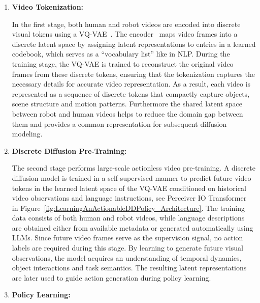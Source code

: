 \begin{enumerate}
    \item \textbf{Video Tokenization:}
    
    In the first stage, both human and robot videos are encoded into discrete visual tokens using a \acf{VQ-VAE}~\cite{Oord2017NeuralDR}. The encoder~\cite{Yan2021VideoGPTVG} maps video frames into a discrete latent space by assigning latent representations to entries in a learned codebook, which serves as a ``vocabulary list'' like in \acs{NLP}. 
    During the training stage, the \ac{VQ-VAE} is trained to reconstruct the original video frames from these discrete tokens, ensuring that the tokenization captures the necessary details for accurate video representation.
    As a result, each video is represented as a sequence of discrete tokens that compactly capture objects, scene structure and motion patterns. 
    Furthermore the shared latent space between robot and human videos helps to reduce the domain gap between them and provides a common representation for subsequent diffusion modeling.
    
    \item \textbf{Discrete Diffusion Pre-Training:} 
    
    The second stage performs large-scale actionless video pre-training. A discrete diffusion model is trained in a self-supervised manner to predict future video tokens in the learned latent space of the \ac{VQ-VAE} conditioned on historical video observations and language instructions, see Perceiver IO Transformer~\cite{Jaegle2021PerceiverIA} in Figure~\ref{fig:LearningAnActionableDDPolicy_Architecture}. The training data consists of both human and robot videos, while language descriptions are obtained either from available metadata or generated automatically using \acp{LLM}. Since future video frames serve as the supervision signal, no action labels are required during this stage. By learning to generate future visual observations, the model acquires an understanding of temporal dynamics, object interactions and task semantics. The resulting latent representations are later used to guide action generation during policy learning. 
    
    \item \textbf{Policy Learning:}
    

\end{enumerate}
